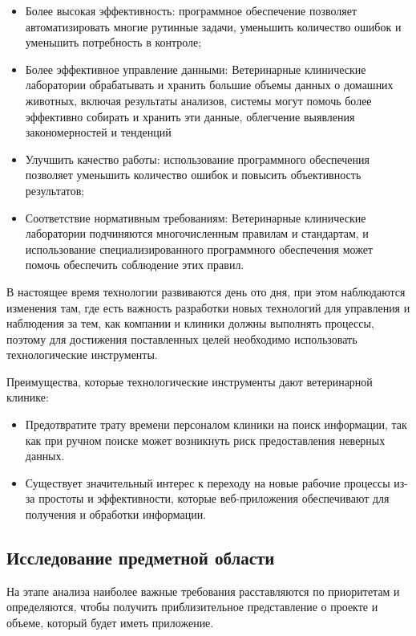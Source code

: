 \begin{itemize}
\item Более высокая эффективность: программное обеспечение позволяет автоматизировать многие рутинные задачи, уменьшить количество ошибок и уменьшить потребность в контроле;
\item Более эффективное управление данными: Ветеринарные клинические лаборатории
обрабатывать и хранить большие объемы данных о домашних животных, включая результаты анализов, системы могут помочь более эффективно собирать и хранить эти данные,
облегчение выявления закономерностей и тенденций
\item Улучшить качество работы: использование программного обеспечения позволяет уменьшить количество ошибок и повысить объективность результатов;
\item Соответствие нормативным требованиям: Ветеринарные клинические лаборатории
подчиняются многочисленным правилам и стандартам, и использование специализированного программного обеспечения может помочь обеспечить соблюдение этих правил.
\end{itemize}


В настоящее время технологии развиваются день ото дня, при этом наблюдаются изменения там, где есть важность разработки новых технологий для управления и наблюдения за тем, как компании и клиники должны выполнять процессы, поэтому для достижения поставленных целей необходимо использовать технологические инструменты.

Преимущества, которые технологические инструменты дают ветеринарной клинике:

\begin{itemize}
\item  Предотвратите трату времени персоналом клиники на поиск информации, так как при ручном поиске может возникнуть риск предоставления неверных данных.

\item  Существует значительный интерес к переходу на новые рабочие процессы из-за простоты и эффективности, которые веб-приложения обеспечивают для получения и обработки информации.
\end{itemize}

\subsection{Исследование предметной области}
На этапе анализа наиболее важные требования расставляются по приоритетам и определяются, чтобы получить приблизительное представление о проекте и объеме, который будет иметь приложение.

